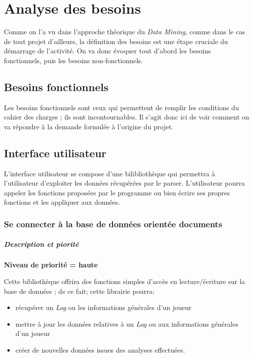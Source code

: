 \chapter{Analyse des besoins}


Comme on l'a vu dans l'approche théorique du \textit{Data Mining}, comme dans le cas de tout projet d'ailleurs, la définition des besoins est une étape cruciale du démarrage de l'activité. On va donc évoquer tout d'abord les besoins fonctionnels, puis les besoins non-fonctionnels.


\section{Besoins fonctionnels} 
Les besoins fonctionnels sont ceux qui permettent de remplir les conditions du cahier des charges ; ils sont incontournables. Il s'agit donc ici de voir comment on va répondre à la demande formulée à l'origine du projet.

\section{Interface utilisateur}
L'interface utilisateur se compose d'une bilibliothèque qui permettra à l'utilisateur d'exploiter les données récupérées par le parser. L'utilisateur pourra appeler les fonctions proposées par le programme ou bien écrire ses propres fonctions et les appliquer aux données.

\subsection{Se connecter à la base de données orientée documents}

\paragraph*{Description et piorité}

\textbf{Niveau de priorité = haute}

Cette bibliothèque offrira des fonctions simples d'accès en lecture/écriture sur la base de données ; de ce fait; cette librairie pourra:
\begin{itemize}
\item récupérer un \textit{Log} ou les informations générales d'un joueur
\item mettre à jour les données relatives à un \textit{Log} ou aux informations générales d'un joueur
\item créer de nouvelles données issues des analyses effectuées.
\end{itemize}

